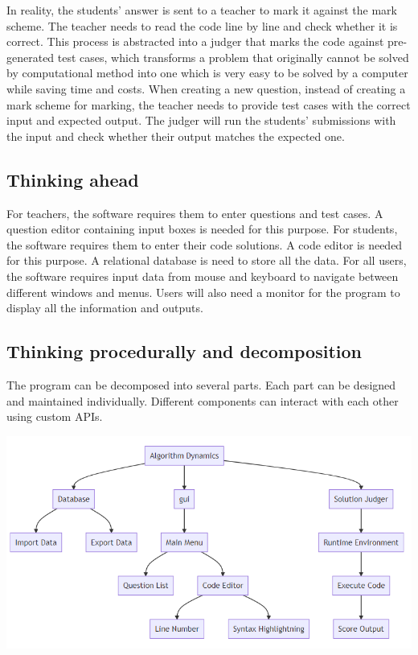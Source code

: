 \documentclass[a4paper]{report}
\begin{document}
In reality, the students' answer is sent to a teacher to mark it against the mark scheme. The teacher needs to read the code line by line and check whether it is correct. This process is abstracted into a judger that marks the code against pre-generated test cases, which transforms a problem that originally cannot be solved by computational method into one which is very easy to be solved by a computer while saving time and costs. When creating a new question, instead of creating a mark scheme for marking, the teacher needs to provide test cases with the correct input and expected output. The judger will run the students' submissions with the input and check whether their output matches the expected one.

\subsection{Thinking ahead}

For teachers, the software requires them to enter questions and test cases. A question editor containing input boxes is needed for this purpose. For students, the software requires them to enter their code solutions. A code editor is needed for this purpose. A relational database is need to store all the data. For all users, the software requires input data from mouse and keyboard to navigate between different windows and menus. Users will also need a monitor for the program to display all the information and outputs.

\subsection{Thinking procedurally and decomposition}

The program can be decomposed into several parts. Each part can be designed and maintained individually. Different components can interact with each other using custom APIs.

\includegraphics[width=\linewidth]{decomposition}
\end{document}
